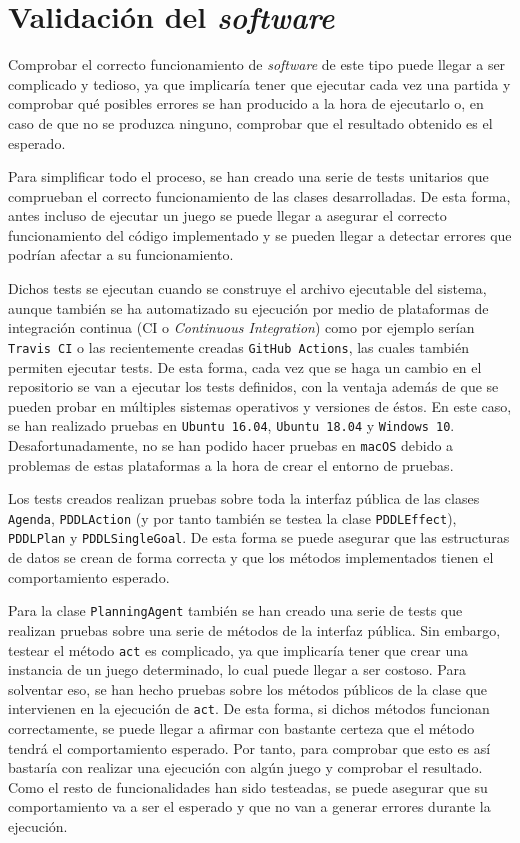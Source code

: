 \section{Validación del \textit{software}}

Comprobar el correcto funcionamiento de \textit{software} de este tipo puede llegar a ser
complicado y tedioso, ya que implicaría tener que ejecutar cada vez una partida y comprobar qué
posibles errores se han producido a la hora de ejecutarlo o, en caso de que no se produzca ninguno,
comprobar que el resultado obtenido es el esperado.

Para simplificar todo el proceso, se han creado una serie de tests unitarios que comprueban
el correcto funcionamiento de las clases desarrolladas. De esta forma, antes incluso de
ejecutar un juego se puede llegar a asegurar el correcto funcionamiento del código implementado
y se pueden llegar a detectar errores que podrían afectar a su funcionamiento.

Dichos tests se ejecutan cuando se construye el archivo ejecutable del sistema, aunque también se
ha automatizado su ejecución por medio de plataformas de integración continua
(CI o \textit{Continuous Integration}) como por ejemplo serían \texttt{Travis CI} o las
recientemente creadas \texttt{GitHub Actions}, las cuales también permiten ejecutar tests.
De esta forma, cada vez que se haga un cambio en el repositorio se van a ejecutar los tests definidos,
con la ventaja además de que se pueden probar en múltiples sistemas operativos y versiones de éstos.
En este caso, se han realizado pruebas en \texttt{Ubuntu 16.04}, \texttt{Ubuntu 18.04}
y \texttt{Windows 10}. Desafortunadamente, no se han podido hacer pruebas en \texttt{macOS}
debido a problemas de estas plataformas a la hora de crear el entorno de pruebas.

Los tests creados realizan pruebas sobre toda la interfaz pública de las clases \texttt{Agenda},
\texttt{PDDLAction} (y por tanto también se testea la clase \texttt{PDDLEffect}), \texttt{PDDLPlan} y
\texttt{PDDLSingleGoal}. De esta forma se puede asegurar que las estructuras de datos se crean
de forma correcta y que los métodos implementados tienen el comportamiento esperado.

Para la clase \texttt{PlanningAgent} también se han creado una serie de tests que realizan
pruebas sobre una serie de métodos de la interfaz pública. Sin embargo, testear el método
\texttt{act} es complicado, ya que implicaría tener que crear una instancia de un juego
determinado, lo cual puede llegar a ser costoso. Para solventar eso, se han hecho pruebas
sobre los métodos públicos de la clase que intervienen en la ejecución de \texttt{act}. De esta
forma, si dichos métodos funcionan correctamente, se puede llegar a afirmar con bastante certeza
que el método tendrá el comportamiento esperado. Por tanto, para comprobar que esto es así bastaría
con realizar una ejecución con algún juego y comprobar el resultado. Como el resto de funcionalidades
han sido testeadas, se puede asegurar que su comportamiento va a ser el esperado y que no van a generar
errores durante la ejecución.
